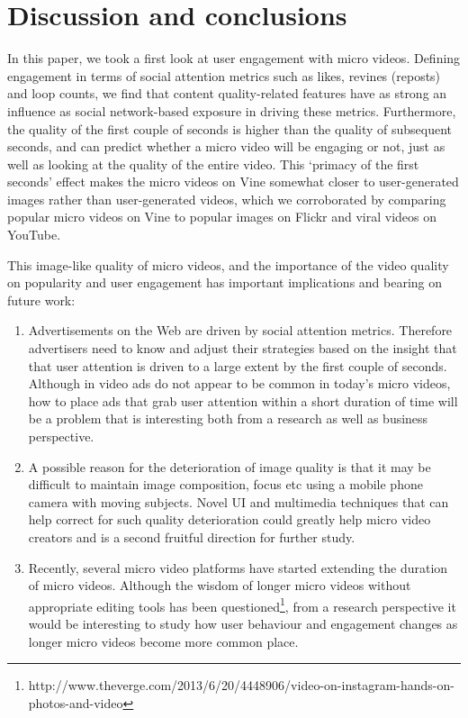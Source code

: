 \section{Discussion and conclusions}
In this paper, we took a first look at user engagement with micro videos. Defining engagement in terms of social attention metrics such as likes, revines (reposts) and loop counts, we find that content quality-related features have as strong an influence as social network-based exposure in driving these metrics. Furthermore, the quality of the first couple of seconds is higher than the quality of subsequent seconds, and can predict whether a micro video will be engaging or not, just as well as looking at the quality of the entire video. This `primacy of the first seconds' effect makes the micro videos on Vine somewhat closer to user-generated images rather than user-generated videos, which we corroborated by comparing popular micro videos on Vine  to popular images on Flickr and viral videos on YouTube.

This image-like quality of micro videos, and the importance of the video quality on popularity and user engagement has important implications and bearing on future work: 
\begin{enumerate}
	\item Advertisements on the Web are driven by social attention metrics. Therefore advertisers need to know and adjust their strategies based on the insight that that user attention is driven to a large extent by the first couple of seconds. Although in video ads do not appear to be common in today's micro videos, how to place ads that grab user attention within a short duration of time will be a problem that is interesting both from a research as well as business perspective.
	\item A possible reason for the deterioration of image quality is that it may be difficult to maintain image composition, focus etc using a mobile phone camera with moving subjects. Novel UI and multimedia techniques that can help correct for such quality deterioration could greatly help micro video creators and is a second fruitful direction for further study. 
	\item Recently, several micro video platforms have started extending the duration of micro videos. Although the wisdom of longer micro videos without appropriate editing tools has been questioned\footnote{http://www.theverge.com/2013/6/20/4448906/video-on-instagram-hands-on-photos-and-video}, from a research perspective it would be interesting to study how user behaviour and engagement changes as longer micro videos become more common place.
\end{enumerate}

